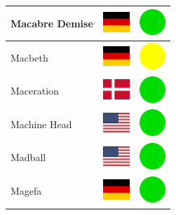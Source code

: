 \documentclass[12pt, a4paper, twoside]{report}
\begin{document}
\begin{center}
\begin{longtable}{|p{5cm}|p{2cm}|p{2cm}|}
 Macabre Demise                                             & \includegraphics[width=1cm]{../4x3/de} &   \includegraphics[width=1cm]{../likes/y} \\ \hline
 Macbeth                                                    & \includegraphics[width=1cm]{../4x3/de} &   \includegraphics[width=1cm]{../likes/m} \\ \hline
 Maceration                                                 & \includegraphics[width=1cm]{../4x3/dk} &   \includegraphics[width=1cm]{../likes/y} \\ \hline
 Machine Head                                               & \includegraphics[width=1cm]{../4x3/us} &   \includegraphics[width=1cm]{../likes/y} \\ \hline
 Madball                                                    & \includegraphics[width=1cm]{../4x3/us} &   \includegraphics[width=1cm]{../likes/y} \\ \hline
 Magefa                                                     & \includegraphics[width=1cm]{../4x3/de} &   \includegraphics[width=1cm]{../likes/y} \\ \hline

\end{longtable}
\end{center}
\end{document}

